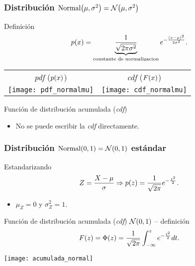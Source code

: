\documentclass[table]{beamer}
\begin{document}
\begin{frame}
    \frametitle{Distribución $\text{Normal} \parens{\mu, \sigma^{2}} = \normal{\mu}{\sigma^{2}}$}
    \begin{block}{Definición}
        \begin{equation*}
            \pdf{x} = \underbrace{\frac{1}{\sqrt{2 \pi \sigma^{2}}}}_{\text{constante de normalizacion}} e^{- \frac{\parens{x - \mu}^{2}}{2 \sigma^{2}}} .
        \end{equation*}
    \end{block}
    \begin{center}
        \begin{tabular}{cc}
            \emph{pdf} ($\pdf{x}$) & \emph{cdf} ($\FF{x}$) \\
            \texttt{[image: pdf\_normalmu]} &
            \texttt{[image: cdf\_normalmu]}
        \end{tabular}
    \end{center}
    \begin{block}{Función de distribución acumulada (\emph{cdf})}
        \begin{itemize}
            \item No se puede escribir la \emph{cdf} directamente.
        \end{itemize}
    \end{block}
\end{frame}

\begin{frame}
    \frametitle{Distribución $\text{Normal} \parens{0, 1} = \normal{0}{1}$ estándar}
    \begin{block}{Estandarizando}
        \begin{equation*}
            Z = \frac{X - \mu}{\sigma} \Rightarrow
            \pdf{z} = \frac{1}{\sqrt{2 \pi}} e^{- \frac{z^{2}}{2}} .
        \end{equation*}
        \begin{itemize}
            \item $\mu_{Z} = 0$ y $\sigma^{2}_{Z} = 1$.
        \end{itemize}
    \end{block}
    \begin{block}{Función de distribución acumulada (\emph{cdf}) $\normal{0}{1}$ -- definición}
        \begin{equation*}
            \FF{z} = \Phi \parens{z} = \frac{1}{\sqrt{2 \pi}} \int_{- \infty}^{z} e^{- \frac{t^{2}}{2}} d t .
        \end{equation*}
    \end{block}
    \begin{center}
        \texttt{[image: acumulada\_normal]}
    \end{center}
\end{frame}
\end{document}
